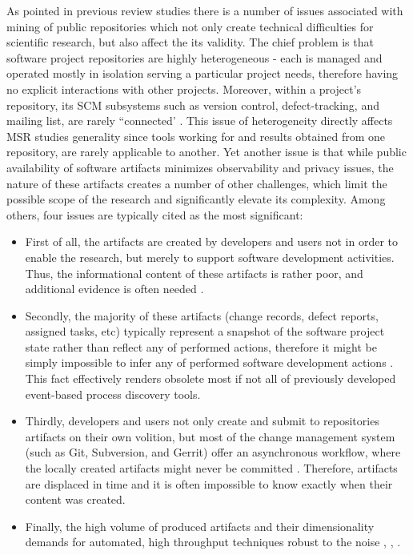 As pointed in previous review studies \cite{citeulike:12550438} \cite{citeulike:7853299} \cite{citeulike:7465518} there
is a number of issues associated with mining of public repositories which not only create technical difficulties for scientific research,
but also affect the its validity. 
The chief problem is that software project repositories are highly heterogeneous - each is managed and operated 
mostly in isolation serving a particular project needs, therefore having no explicit interactions with other projects. 
Moreover, within a project's repository, its SCM subsystems such as version control, defect-tracking, and mailing list, 
are rarely ``connected'  \cite{citeulike:13058334}. 
This issue of heterogeneity directly affects MSR studies generality since tools working for and results obtained from 
one repository, are rarely applicable to another.
Yet another issue is that while public availability of software artifacts minimizes observability and privacy issues, 
the nature of these artifacts creates a number of other challenges, which limit the possible scope of the research and 
significantly elevate its complexity. Among others, four issues are typically cited as the most significant:
\begin{itemize}
 \item First of all, the artifacts are created by developers and users not in order to enable the research,
but merely to support software development activities. Thus, the informational content of these artifacts is rather 
poor, and additional evidence is often needed \cite{citeulike:342840} \cite{citeulike:7954249} 
\cite{citeulike:7260421}.
 \item Secondly, the majority of these artifacts (change records, defect reports, assigned tasks, etc) 
typically represent a snapshot of the software project state rather than reflect any of performed actions, 
therefore it might be simply impossible to infer any of performed software development actions \cite{citeulike:1296888}.
This fact effectively renders obsolete most if not all of previously developed event-based process discovery tools.
 \item Thirdly, developers and users not only create and submit to repositories artifacts on their own volition,
but most of the change management system (such as Git, Subversion, and Gerrit) offer an asynchronous workflow, 
where the locally created artifacts might never be committed \cite{citeulike:2280690} \cite{citeulike:9037939}. 
Therefore, artifacts are displaced in time and it is often impossible to know exactly when their content was created.
 \item Finally, the high volume of produced artifacts and their dimensionality demands for automated, high throughput 
techniques robust to the noise \cite{citeulike:12550438}, \cite{citeulike:7853299}, \cite{citeulike:4534888}.
\end{itemize}

